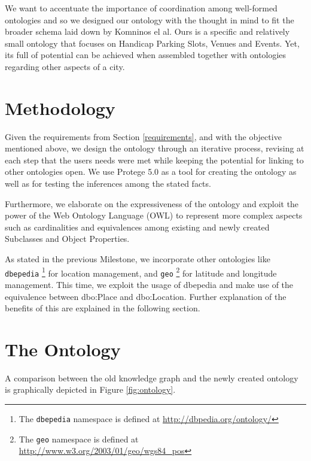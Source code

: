 \documentclass[runningheads,a4paper]{../../StyleFiles/llncs}
\begin{document}
We want to accentuate the importance of coordination among well-formed ontologies and so we designed our ontology with the thought in mind to fit the broader schema laid down by Komninos el al. Ours is a specific and relatively small ontology that focuses on Handicap Parking Slots, Venues and Events. Yet, its full of potential can be achieved when assembled together with ontologies regarding other aspects of a city. 


\section{Methodology}

Given the requirements from Section \ref{requirements}, and with the objective mentioned above, we design the ontology through an iterative process, revising at each step that the users needs were met while keeping the potential for linking to other ontologies open. We use Protege 5.0 as a tool for creating the ontology as well as for testing the inferences among the stated facts. 

Furthermore, we elaborate on the expressiveness of the ontology and exploit the power of the Web Ontology Language (OWL) to represent more complex aspects such as cardinalities and equivalences among existing and newly created Subclasses and Object Properties.

As stated in the previous Milestone, we incorporate other ontologies like \texttt{dbepedia} \footnote{The \texttt{dbepedia} namespace is defined at \url{http://dbpedia.org/ontology/}} for location management, and \texttt{geo} \footnote{The \texttt{geo} namespace is defined at \url{http://www.w3.org/2003/01/geo/wgs84_pos}} for latitude and longitude management. This time, we exploit the usage of dbepedia and make use of the equivalence between dbo:Place and dbo:Location. Further explanation of the benefits of this are explained in the following section.

\section{The Ontology}
A comparison between the old knowledge graph and the newly created ontology is graphically depicted in Figure \ref{fig:ontology}. 
\end{document}
